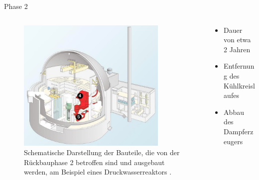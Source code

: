 \begin{frame}{Phase 2}
  \begin{columns}

    \begin{column}{0.48\textwidth}
      \begin{figure}
         \centering
         \includegraphics[width=0.85\textwidth]{./bilder/abbau_phase_2_spiegel.png}
         \caption{ Schematische Darstellung der Bauteile, die von der Rückbauphase 2 betroffen sind und ausgebaut werden, am Beispiel eines Druckwasserreaktors \cite{abbau_grafik_stade}. }
         \label{ fig: phase_2 }
       \end{figure}
     \end{column}

     \begin{column}{0.48\textwidth}
       \begin{itemize}
         \setlength\itemsep{1.2em}
          \item{ Dauer von etwa 2 Jahren}
           \item{ Entfernung des Kühlkreislaufes }
           \item{ Abbau des Dampferzeugers}
       \end{itemize}
     \end{column}

  \end{columns}
\end{frame}



